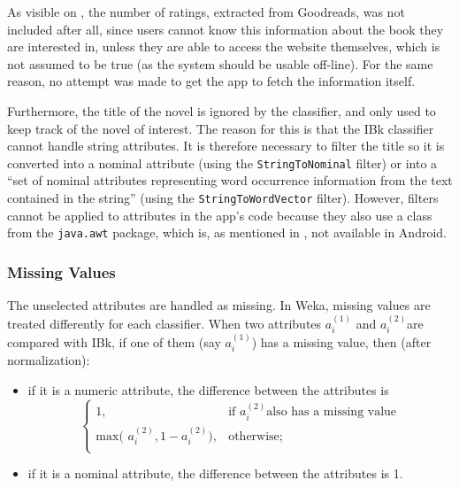\documentclass{mproj}
\begin{document}
As visible on , the number of ratings, extracted from Goodreads, was not included after all, since users cannot know this information about the book they are interested in, unless they are able to access the website themselves, which is not assumed to be true (as the system should be usable off-line). For the same reason, no attempt was made to get the app to fetch the information itself. \par

Furthermore, the title of the novel is ignored by the classifier, and only used to keep track of the novel of interest. The reason for this is that the IBk classifier cannot handle string attributes. It is therefore necessary to filter the title so it is converted into a nominal attribute (using the \verb|StringToNominal| filter) or into a ``set of nominal attributes representing word occurrence information from the text contained in the string'' (using the \verb|StringToWordVector| filter). However, filters cannot be applied to attributes in the app's code because they also use a class from the \verb|java.awt| package, which is, as mentioned in , not available in Android.

\subsubsection*{Missing Values}\label{missing_values}
The unselected attributes are handled as missing. In Weka, missing values are treated differently for each classifier. When two attributes $a_i^{(1)}$ and $a_i^{(2)}$are compared with IBk, if one of them (say $a_i^{(1)}$) has a missing value, then (after normalization):
\begin{itemize}[topsep=0pt]
	\item if it is a numeric attribute, the difference between the attributes is
	\begin{equation}
		\begin{cases}
			1, & \text{if } a_i^{(2)} \text{also has a missing value} \\
			\text{max( }a_i^{(2)} , 1 - a_i^{(2)} \text{)}, & \text{otherwise;} \\
		\end{cases}
	\end{equation}
	\item if it is a nominal attribute, the difference between the attributes is 1.	
\end{itemize}
\end{document}

